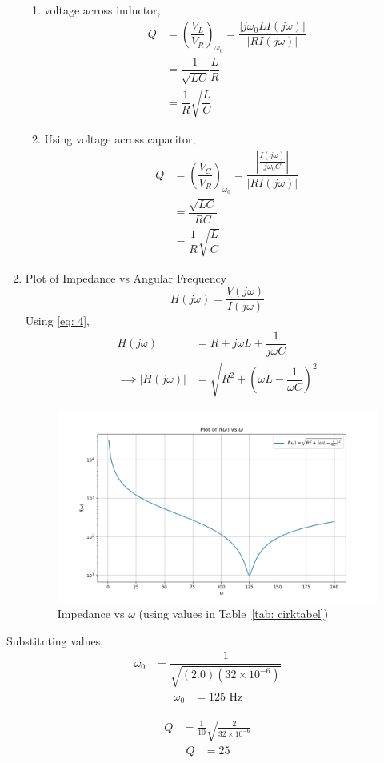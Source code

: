 \documentclass[journal,12pt,twocolumn]{IEEEtran}
\newcommand\tabref{Table~\ref}
\theoremstyle{remark}
\providecommand{\abs}[1]{\left\vert#1\right\vert}
\begin{document}
\begin{enumerate}
\begin{enumerate}
\item voltage across inductor,
\begin{align}
    Q &= \left(\dfrac{V_L}{V_R}\right)_{\omega_0} = \dfrac{\lvert{j\omega_0 LI(j\omega)}\rvert}{\lvert RI(j\omega) \rvert}\\
    &= \dfrac{1}{\sqrt{LC}}\dfrac{L}{R}\\
    &= \dfrac{1}{R}\sqrt{\dfrac{L}{C}}
\end{align}
\item Using voltage across capacitor,
\begin{align}
	Q &= \left(\dfrac{V_C}{V_R}\right)_{\omega_0} = \dfrac{\abs{\frac{I(j\omega)}{j\omega_0 C}}}{\lvert RI(j\omega) \rvert}\\
    &= \dfrac{\sqrt{LC}}{RC}\\
    &= \dfrac{1}{R}\sqrt{\dfrac{L}{C}}
\end{align}
\end{enumerate}
\item{Plot of Impedance vs Angular Frequency}
\begin{equation}
    H(j\omega) = \dfrac{V(j\omega)}{I(j\omega)}
\end{equation}
Using \eqref{eq: 4},
\begin{align}
      H(j\omega) &= R + j\omega L + \dfrac{1}{j\omega C}\\
     \implies \lvert H(j\omega) \rvert &= \sqrt{R^2 + \left(\omega L - \dfrac{1}{\omega C}\right)^2}
\end{align}
\begin{figure}[!h]
    \centering
    \includegraphics[width = \columnwidth]{ncert-physics/12/7/6/figs/q_plot.png}
    \caption{Impedance vs $\omega$ (using values in \tabref{tab: cirktabel})}
    \label{fig:hswa_plot}
\end{figure}
\end{enumerate}

Substituting values,
\begin{align}
\omega_0 &= \dfrac{1}{\sqrt{(2.0)(32 \times 10^{-6})}}
\end{align}
\begin{align}
\omega_0 &= 125 \text{ Hz}
\end{align}


\begin{align}
Q &= \frac{1}{10}\sqrt{\frac{2}{32 \times 10^{-6}}}
\end{align}
\begin{align}
Q &= 25
\end{align}


\end{document}
